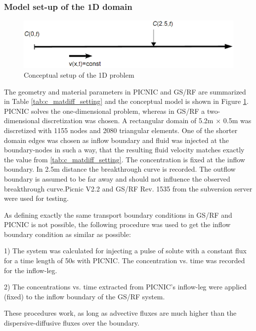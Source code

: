 \subsubsection*{Model set-up of the 1D domain}
\begin{figure}[!htb]
  \begin{center}
    \includegraphics[scale=0.25]{C/figures/fig_matdiff_domain.eps}
  \end{center}
  \caption{Conceptual setup of the 1D problem}
  \label{c:matdiff_dom}
\end{figure}
The geometry and material parameters in PICNIC and GS/RF are
summarized in Table \ref{tab:c_matdiff_setting} and the conceptual
model is shown in Figure \ref{c:matdiff_dom}. PICNIC solves the
one-dimensional problem, whereas in GS/RF a two-dimensional
discretization was chosen. A rectangular domain of 5.2m $\times$
0.5m was discretized with 1155 nodes and 2080 triangular elements.
One of the shorter domain edges was chosen as inflow boundary and
fluid was injected at the boundary-nodes in such a way, that the
resulting fluid velocity matches exactly the value from
\ref{tab:c_matdiff_setting}. The concentration is fixed at the
inflow boundary. In 2.5m distance the breakthrough curve is
recorded. The outflow boundary is assumed to be far away and should
not influence the observed breakthrough curve.Picnic V2.2 and GS/RF
Rev. 1535 from the subversion server were used for testing.

As defining exactly the same transport boundary conditions in GS/RF
and PICNIC is not possible, the following procedure was used to get
the inflow boundary condition as similar as possible:

1) The system was calculated for injecting a pulse of solute with a
constant flux for a time length of 50s with PICNIC. The
concentration vs. time was recorded for the inflow-leg.

2) The concentrations vs. time extracted from PICNIC's inflow-leg
were applied (fixed) to the inflow boundary of the GS/RF system.

These procedures work, as long as advective fluxes are much higher
than the dispersive-diffusive fluxes over the boundary.

